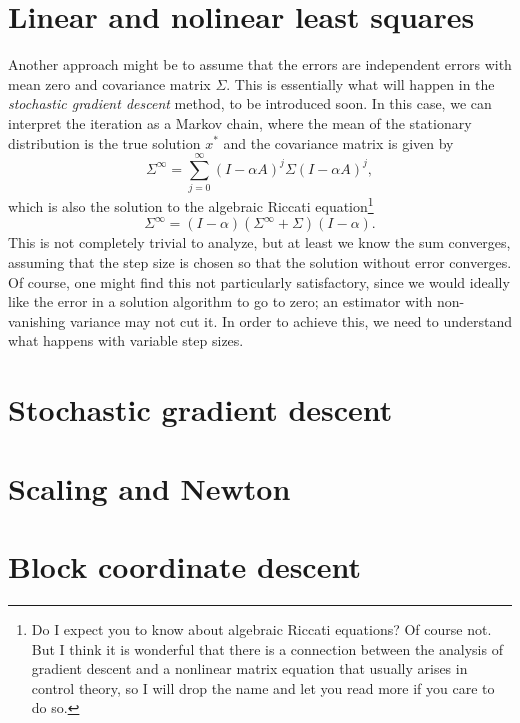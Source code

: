 \documentclass[12pt, leqno]{article} %
\begin{document}

\section{Linear and nolinear least squares}

Another approach might be to assume that the errors are independent
errors with mean zero and covariance matrix $\Sigma$.  This is
essentially what will happen in the {\em stochastic gradient descent}
method, to be introduced soon.  In this case, we can interpret the iteration
as a Markov chain, where the mean of the stationary distribution is
the true solution $x^*$ and the covariance matrix is given by
\[
  \Sigma^\infty = \sum_{j=0}^\infty (I-\alpha A)^j \Sigma (I-\alpha A)^j,
\]
which is also the solution to the algebraic Riccati equation\footnote{%
Do I expect you to know about algebraic Riccati equations?  Of course
not.  But I think it is wonderful that there is a connection between
the analysis of gradient descent and a nonlinear matrix equation that
usually arises in control theory, so I will drop the name and let you
read more if you care to do so.
}
\[
  \Sigma^\infty = (I-\alpha) (\Sigma^\infty + \Sigma) (I-\alpha).
\]
This is not completely trivial to analyze, but at least we know the
sum converges, assuming that the step size is chosen so that the
solution without error converges.
Of course, one might find this not particularly satisfactory, since
we would ideally like the error in a solution algorithm to go to zero;
an estimator with non-vanishing variance may not cut it.  In order to
achieve this, we need to understand what happens with variable
step sizes.

\section{Stochastic gradient descent}

\section{Scaling and Newton}

\section{Block coordinate descent}
\end{document}
